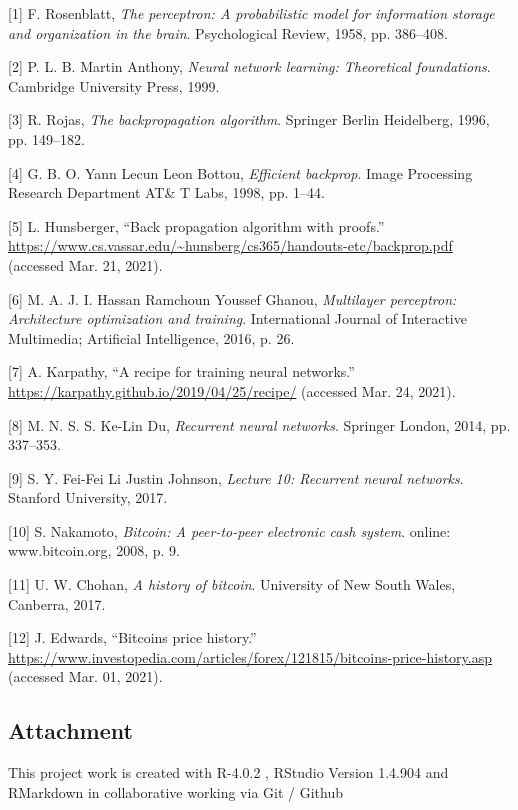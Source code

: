 \documentclass[
]{article}
\newenvironment{cslreferences}%
  {}%
  {\par}
\begin{document}
\hypertarget{refs}{}
\begin{cslreferences}
\leavevmode\hypertarget{ref-perceptron_paper}{}%
{[}1{]} F. Rosenblatt, \emph{The perceptron: A probabilistic model for
information storage and organization in the brain}. Psychological
Review, 1958, pp. 386--408.

\leavevmode\hypertarget{ref-nn_learning_theoretical_foundations}{}%
{[}2{]} P. L. B. Martin Anthony, \emph{Neural network learning:
Theoretical foundations}. Cambridge University Press, 1999.

\leavevmode\hypertarget{ref-backpropagation}{}%
{[}3{]} R. Rojas, \emph{The backpropagation algorithm}. Springer Berlin
Heidelberg, 1996, pp. 149--182.

\leavevmode\hypertarget{ref-efficient_backprop}{}%
{[}4{]} G. B. O. Yann Lecun Leon Bottou, \emph{Efficient backprop}.
Image Processing Research Department AT\& T Labs, 1998, pp. 1--44.

\leavevmode\hypertarget{ref-backpropagation_proofs}{}%
{[}5{]} L. Hunsberger, ``Back propagation algorithm with proofs.''
\url{https://www.cs.vassar.edu/~hunsberg/cs365/handouts-etc/backprop.pdf}
(accessed Mar. 21, 2021).

\leavevmode\hypertarget{ref-mlp_architecture}{}%
{[}6{]} M. A. J. I. Hassan Ramchoun Youssef Ghanou, \emph{Multilayer
perceptron: Architecture optimization and training}. International
Journal of Interactive Multimedia; Artificial Intelligence, 2016, p. 26.

\leavevmode\hypertarget{ref-recipe_training}{}%
{[}7{]} A. Karpathy, ``A recipe for training neural networks.''
\url{https://karpathy.github.io/2019/04/25/recipe/} (accessed Mar. 24,
2021).

\leavevmode\hypertarget{ref-RNN}{}%
{[}8{]} M. N. S. S. Ke-Lin Du, \emph{Recurrent neural networks}.
Springer London, 2014, pp. 337--353.

\leavevmode\hypertarget{ref-RNN_Stanford}{}%
{[}9{]} S. Y. Fei-Fei Li Justin Johnson, \emph{Lecture 10: Recurrent
neural networks}. Stanford University, 2017.

\leavevmode\hypertarget{ref-bitcoin}{}%
{[}10{]} S. Nakamoto, \emph{Bitcoin: A peer-to-peer electronic cash
system}. online: www.bitcoin.org, 2008, p. 9.

\leavevmode\hypertarget{ref-A_History_of_Bitcoin}{}%
{[}11{]} U. W. Chohan, \emph{A history of bitcoin}. University of New
South Wales, Canberra, 2017.

\leavevmode\hypertarget{ref-Bitcoin_history}{}%
{[}12{]} J. Edwards, ``Bitcoins price history.''
\url{https://www.investopedia.com/articles/forex/121815/bitcoins-price-history.asp}
(accessed Mar. 01, 2021).
\end{cslreferences}

\newpage

\hypertarget{attachment}{%
\subsection{Attachment}\label{attachment}}

This project work is created with R-4.0.2 , RStudio Version 1.4.904 and
RMarkdown in collaborative working via Git / Github
\end{document}
